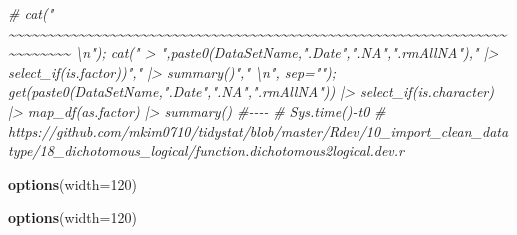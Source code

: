 \documentclass[
]{article}
\newenvironment{Shaded}{\begin{snugshade}}{\end{snugshade}}
\newcommand{\AttributeTok}[1]{\textcolor[rgb]{0.13,0.29,0.53}{#1}}
\newcommand{\CommentTok}[1]{\textcolor[rgb]{0.56,0.35,0.01}{\textit{#1}}}
\newcommand{\DecValTok}[1]{\textcolor[rgb]{0.00,0.00,0.81}{#1}}
\newcommand{\FunctionTok}[1]{\textcolor[rgb]{0.13,0.29,0.53}{\textbf{#1}}}
\newcommand{\NormalTok}[1]{#1}
\begin{document}
\begin{Shaded}
\begin{Highlighting}[]
\CommentTok{\# cat("    \textasciitilde{}\textasciitilde{}\textasciitilde{}\textasciitilde{}\textasciitilde{}\textasciitilde{}\textasciitilde{}\textasciitilde{}\textasciitilde{}\textasciitilde{}\textasciitilde{}\textasciitilde{}\textasciitilde{}\textasciitilde{}\textasciitilde{}\textasciitilde{}\textasciitilde{}\textasciitilde{}\textasciitilde{}\textasciitilde{}\textasciitilde{}\textasciitilde{}\textasciitilde{}\textasciitilde{}\textasciitilde{}\textasciitilde{}\textasciitilde{}\textasciitilde{}\textasciitilde{}\textasciitilde{}\textasciitilde{}\textasciitilde{}\textasciitilde{}\textasciitilde{}\textasciitilde{}\textasciitilde{}\textasciitilde{}\textasciitilde{}\textasciitilde{}\textasciitilde{}\textasciitilde{}\textasciitilde{}\textasciitilde{}\textasciitilde{}\textasciitilde{}\textasciitilde{}\textasciitilde{}\textasciitilde{}\textasciitilde{}\textasciitilde{}\textasciitilde{}\textasciitilde{}\textasciitilde{}\textasciitilde{}\textasciitilde{}\textasciitilde{}\textasciitilde{}\textasciitilde{}\textasciitilde{}\textasciitilde{}\textasciitilde{}\textasciitilde{}\textasciitilde{}\textasciitilde{}\textasciitilde{}\textasciitilde{}\textasciitilde{}\textasciitilde{}\textasciitilde{}\textasciitilde{}\textasciitilde{}\textasciitilde{}    \textbackslash{}n"); cat(" \textgreater{} ",paste0(DataSetName,".Date",".NA",".rmAllNA")," |\textgreater{} select\_if(is.factor))"," |\textgreater{} summary()","  \textbackslash{}n", sep=""); get(paste0(DataSetName,".Date",".NA",".rmAllNA")) |\textgreater{} select\_if(is.character) |\textgreater{} map\_df(as.factor) |\textgreater{} summary() \#{-}{-}{-}{-}  }
\CommentTok{\# Sys.time(){-}t0}
\CommentTok{\# https://github.com/mkim0710/tidystat/blob/master/Rdev/10\_import\_clean\_datatype/18\_dichotomous\_logical/function.dichotomous2logical.dev.r}
\end{Highlighting}
\end{Shaded}

\begin{Shaded}
\begin{Highlighting}[]
\FunctionTok{options}\NormalTok{(}\AttributeTok{width=}\DecValTok{120}\NormalTok{)}
\end{Highlighting}
\end{Shaded}

\begin{Shaded}
\begin{Highlighting}[]
\FunctionTok{options}\NormalTok{(}\AttributeTok{width=}\DecValTok{120}\NormalTok{)}
\end{Highlighting}
\end{Shaded}
\end{document}
